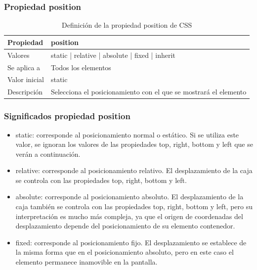 
\begin{frame}
\frametitle{Propiedad position}

\begin{center}
  \begin{table}
   \begin{tabular}{p{1.8cm}p{7.8cm}}
Propiedad & \bf{position} \\ \hline
Valores& static | relative | absolute | fixed | inherit \\ \hline
Se aplica a& Todos los elementos \\ \hline
Valor inicial& static \\ \hline
Descripción& Selecciona el posicionamiento con el que se mostrará el elemento \\ \hline
  \end{tabular}
   \caption{Definición de la propiedad position de CSS}
 \end{table}
\end{center}


\end{frame}




\begin{frame}
\frametitle{Significados propiedad position}

\begin{itemize}
  \item static: corresponde al posicionamiento normal o estático. Si se utiliza este valor, se ignoran los valores de las propiedades top, right, bottom y left que se verán a continuación.
  \item relative: corresponde al posicionamiento relativo. El desplazamiento de la caja se controla con las propiedades top, right, bottom y left.
  \item absolute: corresponde al posicionamiento absoluto. El desplazamiento de la caja también se controla con las propiedades top, right, bottom y left, pero su interpretación es mucho más compleja, ya que el origen de coordenadas del desplazamiento depende del posicionamiento de su elemento contenedor.
  \item fixed: corresponde al posicionamiento fijo. El desplazamiento se establece de la misma forma que en el posicionamiento absoluto, pero en este caso el elemento permanece inamovible en la pantalla.
\end{itemize}

\end{frame}


